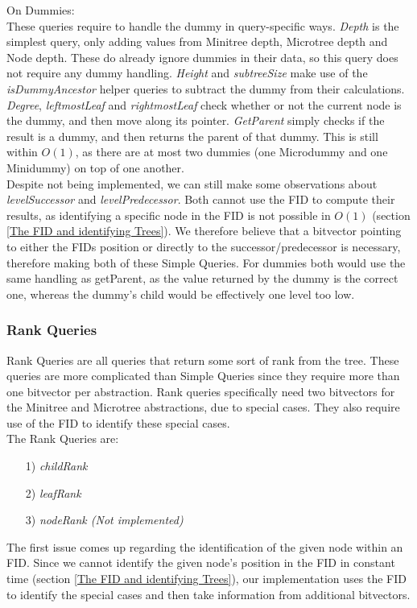 \documentclass{article}
\begin{document}
On Dummies:\\
These queries require to handle the dummy in query-specific ways. \textit{Depth} is the simplest query, only adding values from Minitree depth, Microtree depth and Node depth. These do already ignore dummies in their data, so this query does not require any dummy handling. \textit{Height} and \textit{subtreeSize} make use of the \textit{isDummyAncestor} helper queries to subtract the dummy from their calculations. \textit{Degree}, \textit{leftmostLeaf} and \textit{rightmostLeaf} check whether or not the current node is the dummy, and then move along its pointer. \textit{GetParent} simply checks if the result is a dummy, and then returns the parent of that dummy. This is still within $O(1)$, as there are at most two dummies (one Microdummy and one Minidummy) on top of one another.\\
Despite not being implemented, we can still make some observations about 
\textit{levelSuccessor} and \textit{levelPredecessor}. Both cannot use the FID to compute their results, as identifying a specific node in the FID is not possible in $O(1)$ (section \ref{The FID and identifying Trees}). We therefore believe that a bitvector pointing to either the FIDs position or directly to the successor/predecessor is necessary, therefore making both of these Simple Queries. For dummies both would use the same handling as getParent, as the value returned by the dummy is the correct one, whereas the dummy's child would be effectively one level too low.

\subsubsection{Rank Queries} \label{Rank Queries}
Rank Queries are all queries that return some sort of rank from the tree. These queries are more complicated than Simple Queries since they require more than one bitvector per abstraction.
Rank queries specifically need two bitvectors for the Minitree and Microtree abstractions, due to special cases.
They also require use of the FID to identify these special cases.\\
The Rank Queries are:\\
\begin{itemize}
	\item[1)] \textit{childRank}
	\item[2)] \textit{leafRank}
	\item[3)] \textit{nodeRank (Not implemented)}
\end{itemize}
The first issue comes up regarding the identification of the given node within an FID. Since we cannot identify the given node's position in the FID in constant time (section \ref{The FID and identifying Trees}), our implementation uses the FID to identify the special cases and then take information from additional bitvectors.
\end{document}
